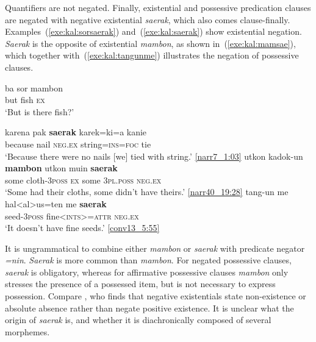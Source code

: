 \documentclass[output=paper,colorlinks,citecolor=brown,draft]{langscibook}
\begin{document}
Quantifiers are not negated. 
Finally, existential and possessive predication clauses are negated with negative existential \textit{saerak}, which also comes clause-finally. Examples~(\ref{exe:kal:sorsaerak}) and~(\ref{exe:kal:saerak}) show existential negation. \textit{Saerak} is the opposite of existential \textit{mambon}, as shown in~(\ref{exe:kal:mamsae}), which together with~(\ref{exe:kal:tangunme}) illustrates the negation of possessive clauses.

\ea	\label{exe:kal:sorsaerak}
\begin{xlist}
 	{
	\gll ba sor mambon\\
	but fish \textsc{ex}\\
	\glt	`But is there fish?'
}

\end{xlist}
\z
\ea \label{exe:kal:saerak}
\gll karena pak \textbf{saerak} karek=ki=a kanie\\
because nail \textsc{neg.ex} string=\textsc{ins=foc} tie\\
\glt	`Because there were no nails [we] tied with string.' {\href{http://hdl.handle.net/10050/00-0000-0000-0004-1BB3-0}{[narr7\_1:03]}}
\z 
\ea \label{exe:kal:mamsae}
\gll utkon kadok-un \textbf{mambon} utkon muin \textbf{saerak}\\
some cloth-\textsc{3poss} \textsc{ex} some \textsc{3pl.poss} \textsc{neg.ex}\\
\glt	`Some had their cloths, some didn't have theirs.' {\href{http://hdl.handle.net/10050/00-0000-0000-0004-1BBB-2}{[narr40\_19:28]}}
\z 
\ea \label{exe:kal:tangunme}
\gll tang-un me hal<al>us=ten me \textbf{saerak}\\
seed-\textsc{3poss} {\glme} fine<\textsc{ints}>=\textsc{attr} {\glme} \textsc{neg.ex}\\
\glt	`It doesn't have fine seeds.' {\href{http://hdl.handle.net/10050/00-0000-0000-0004-1BA6-6}{[conv13\_5:55]}}
\z 

It is ungrammatical to combine either \textit{mambon} or \textit{saerak} with predicate negator \textit{=nin}. \textit{Saerak} is more common than \textit{mambon}. For negated possessive clauses, \textit{saerak} is obligatory, whereas for affirmative possessive clauses \textit{mambon} only stresses the presence of a possessed item, but is not necessary to express possession. Compare \citet{Veselinova2013neg.exist}, who finds that negative existentials state non-existence or absolute absence rather than negate positive existence. It is unclear what the origin of \textit{saerak} is, and whether it is diachronically composed of several morphemes. 
\end{document}
